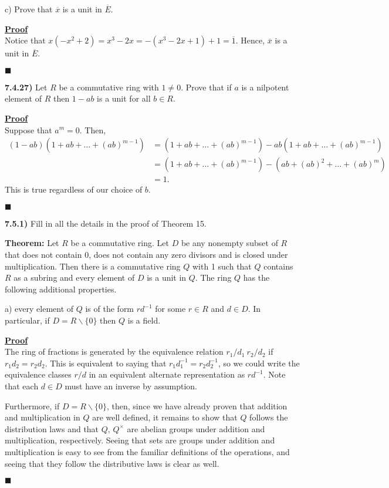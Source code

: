 \documentclass[12pt,a4paper]{article}
\newcommand{\prob}[2]{\textbf{#1)} #2}
\newenvironment{proof}
{
\textbf{\underline{Proof}} \\
}
{
\hfill $\blacksquare$
}
\begin{document}
c) Prove that $\overline{x}$ is a unit in $\overline{E}$.

\begin{proof}
    Notice that $x\left( -x^2 + 2 \right) = x^3 - 2x = -\left( x^3 - 2x + 1 \right) + 1 = \overline{1}$.
    Hence, $\overline{x}$ is a unit in $\overline{E}$.
\end{proof}

\prob{7.4.27}{
Let $R$ be a commutative ring with $1 \ne 0$.
Prove that if $a$ is a nilpotent element of $R$ then $1 - ab$ is a unit for all $b \in R$.
}

\begin{proof}
    Suppose that $a^{m} = 0$.
    Then, 
    \begin{align*}
        (1-ab)(1 + ab + \ldots + (ab)^{m-1}) &= (1 + ab + \ldots + (ab)^{m-1}) - ab(1 + ab + \ldots + (ab)^{m-1}) \\
        &= (1 + ab + \ldots + (ab)^{m-1}) - (ab + (ab)^2 + \ldots + (ab)^{m}) \\
        &= 1
    .\end{align*} 
    This is true regardless of our choice of $b$.
\end{proof}

\prob{7.5.1}{
    Fill in all the details in the proof of Theorem 15.
}

\textbf{Theorem:} Let $R$ be a commutative ring.
Let $D$ be any nonempty subset of $R$ that does not contain 0, does not contain any zero divisors and is closed under multiplication.
Then there is a commutative ring $Q$ with 1 such that $Q$ contains $R$ as a subring and every element of $D$ is a unit in $Q$.
The ring $Q$ has the following additional properties.

a) every element of $Q$ is of the form $rd^{-1}$ for some $r \in R$ and $d \in D$. 
In particular, if $D = R \backslash \{ 0 \} $ then $Q$ is a field.

\begin{proof}
   The ring of fractions is generated by the equivalence relation $r_1/d_1 ~ r_2/d_2$ if $r_1 d_2 = r_2 d_2$.
   This is equivalent to saying that $r_1 d_1^{-1} = r_2 d_2^{-1}$, so we could write the equivalence classes $r/d$ in an equivalent alternate representation as $r d^{-1}$.
   Note that each $d \in D$ must have an inverse by assumption.

   Furthermore, if $D = R \backslash \{ 0 \} $, then, since we have already proven that addition and multiplication in $Q$ are well defined, it remains to show that $Q$ follows the distribution laws and that $Q,\,Q^{\times}$ are abelian groups under addition and multiplication, respectively.
   Seeing that sets are groups under addition and multiplication is easy to see from the familiar definitions of the operations, and seeing that they follow the distributive laws is clear as well.
\end{proof}
\end{document}
